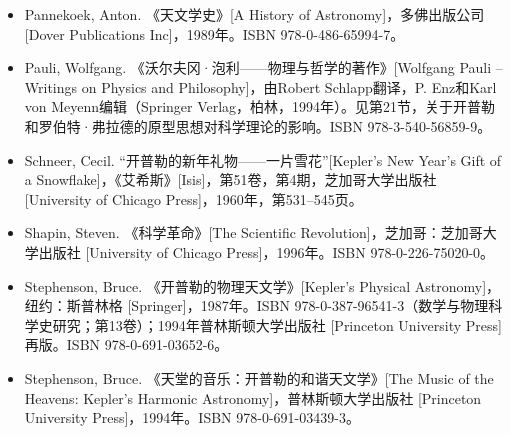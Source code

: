 \begin{itemize}
\item Pannekoek, Anton. 《天文学史》[A History of Astronomy]，多佛出版公司 [Dover Publications Inc]，1989年。ISBN 978-0-486-65994-7。
\item Pauli, Wolfgang. 《沃尔夫冈·泡利——物理与哲学的著作》[Wolfgang Pauli – Writings on Physics and Philosophy]，由Robert Schlapp翻译，P. Enz和Karl von Meyenn编辑（Springer Verlag，柏林，1994年）。见第21节，关于开普勒和罗伯特·弗拉德的原型思想对科学理论的影响。ISBN 978-3-540-56859-9。
\item Schneer, Cecil. “开普勒的新年礼物——一片雪花”[Kepler's New Year's Gift of a Snowflake]，《艾希斯》[Isis]，第51卷，第4期，芝加哥大学出版社 [University of Chicago Press]，1960年，第531–545页。
\item Shapin, Steven. 《科学革命》[The Scientific Revolution]，芝加哥：芝加哥大学出版社 [University of Chicago Press]，1996年。ISBN 978-0-226-75020-0。
\item Stephenson, Bruce. 《开普勒的物理天文学》[Kepler's Physical Astronomy]，纽约：斯普林格 [Springer]，1987年。ISBN 978-0-387-96541-3（数学与物理科学史研究；第13卷）；1994年普林斯顿大学出版社 [Princeton University Press]再版。ISBN 978-0-691-03652-6。
\item Stephenson, Bruce. 《天堂的音乐：开普勒的和谐天文学》[The Music of the Heavens: Kepler's Harmonic Astronomy]，普林斯顿大学出版社 [Princeton University Press]，1994年。ISBN 978-0-691-03439-3。
\end{itemize}